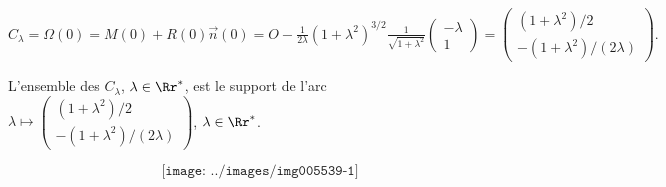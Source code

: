 {{\begin{center}
$C_\lambda=\Omega(0)=M(0)+R(0)\overrightarrow{n}(0)=O-\frac{1}{2\lambda}(1+\lambda^2)^{3/2}\frac{1}{\sqrt{1+\lambda^2}}\left(
\begin{array}{c}
-\lambda\\
1
\end{array}
\right)=\left(
\begin{array}{c}
(1+\lambda^2)/2\\
-(1+\lambda^2)/(2\lambda)
\end{array}
\right).$
\end{center}
L'ensemble des $C_\lambda$, $\lambda\in\Rr^*$, est le support de l'arc $\lambda\mapsto\left(
\begin{array}{c}
(1+\lambda^2)/2\\
-(1+\lambda^2)/(2\lambda)
\end{array}
\right)$, $\lambda\in\Rr^*$.

$$\texttt{[image: ../images/img005539-1]}$$
}
}
